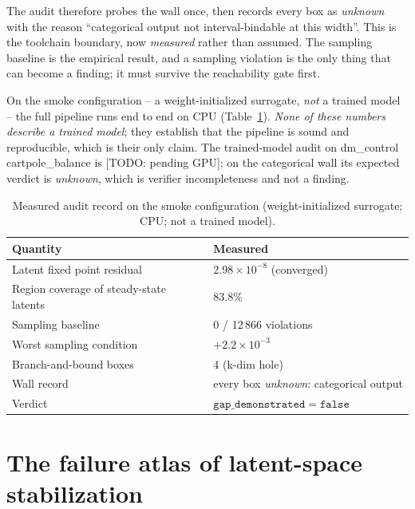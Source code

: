 \documentclass[11pt]{article}
\begin{document}
The audit therefore probes the wall once, then records every box as
\emph{unknown} with the reason ``categorical output not interval-bindable at
this width''. This is the toolchain boundary, now \emph{measured} rather
than assumed. The sampling baseline is the empirical result, and a sampling
violation is the only thing that can become a finding; it must survive the
reachability gate first.

On the smoke configuration -- a weight-initialized surrogate, \emph{not} a
trained model -- the full pipeline runs end to end on CPU
(Table~\ref{tab:smoke}). \emph{None of these numbers describe a trained
model}; they establish that the pipeline is sound and reproducible, which is
their only claim. The trained-model audit on dm\_control cartpole\_balance
is [TODO: pending GPU]; on the categorical wall its expected verdict is
\emph{unknown}, which is verifier incompleteness and not a finding.

\begin{table}[t]
\centering
\caption{Measured audit record on the smoke configuration
(weight-initialized surrogate; CPU; not a trained model).}
\label{tab:smoke}
\small
\begin{tabular}{@{}ll@{}}
\toprule
Quantity & Measured \\
\midrule
Latent fixed point residual & $2.98\times10^{-8}$ (converged) \\
Region coverage of steady-state latents & 83.8\% \\
Sampling baseline & 0 / 12\,866 violations \\
Worst sampling condition & $+2.2\times10^{-3}$ \\
Branch-and-bound boxes & 4 (k-dim hole) \\
Wall record & every box \emph{unknown}: categorical output \\
Verdict & $\texttt{gap\_demonstrated} = \mathtt{false}$ \\
\bottomrule
\end{tabular}
\end{table}

\section{The failure atlas of latent-space stabilization}
\end{document}
